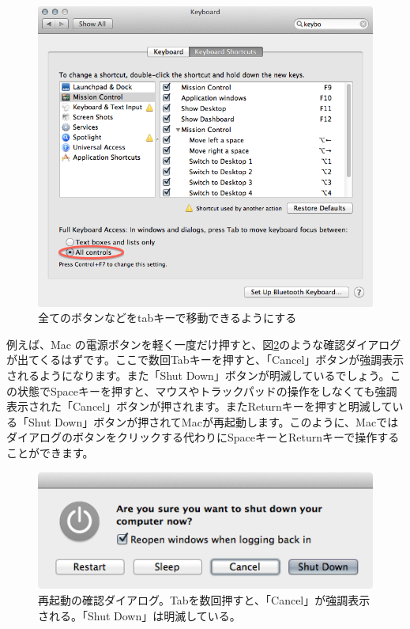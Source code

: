 \begin{figure}
  \begin{center}
    \includegraphics[scale=0.35,bb= 0 0 668 636]{fig/Keyboard2.png}
    \caption{全てのボタンなどをtabキーで移動できるようにする}
    \label{fig_Keyboard2_png}
  \end{center}
\end{figure}

例えば、Mac の電源ボタンを軽く一度だけ押すと、図\ref{fig_reboot_png}のような確認ダイアログが出てくるはずです。ここで数回Tabキーを押すと、「Cancel」ボタンが強調表示されるようになります。また「Shut Down」ボタンが明滅しているでしょう。この状態でSpaceキーを押すと、マウスやトラックパッドの操作をしなくても強調表示された「Cancel」ボタンが押されます。またReturnキーを押すと明滅している「Shut Down」ボタンが押されてMacが再起動します。このように、Macではダイアログのボタンをクリックする代わりにSpaceキーとReturnキーで操作することができます。

\begin{figure}
  \begin{center}
    \includegraphics[scale=0.35,bb= 0 0 453 158]{fig/reboot.png}
    \caption{再起動の確認ダイアログ。Tabを数回押すと、「Cancel」が強調表示される。「Shut Down」は明滅している。}
    \label{fig_reboot_png}
  \end{center}
\end{figure}

